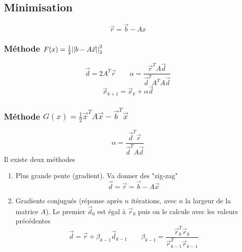 \documentclass[resume]{subfiles}
\begin{document}
\subsection{Minimisation}
$$\boxed{\vec{r}=\vec{b}-Ax}$$
\subsubsection{Méthode $F(x)=\frac{1}{2}\abs{\abs{b-A\vec{x}}}^2_2$}
$$\boxed{\vec{d}=2A^T\vec{r}\qquad \alpha=\frac{\vec{r}^TA\vec{d}}{\vec{d}^TA^TA\vec{d}}}$$
$$\boxed{\vec{x}_{k+1}=\vec{x}_{k}+\alpha\vec{d}}$$
\subsubsection{Méthode $G(x)=\frac{1}{2}\vec{x}^TA\vec{x}-\vec{b}^T\vec{x}$}
$$\boxed{\alpha=\frac{\vec{d}^T\vec{r}}{\vec{d}^TA\vec{d}}}$$
Il existe deux méthodes
\begin{enumerate}
\item Plus grande pente (gradient). Va donner des "zig-zag"
$$\boxed{\vec{d}=\vec{r}=\vec{b}-A\vec{x}}$$
\item Gradients conjugués (réponse après $n$ itérations, avec $n$ la largeur de la matrice $A$). Le premier $\vec{d}_0$ est égal à $\vec{r}_0$ puis on le calcule avec les valeurs précédentes
$$\boxed{\vec{d}=\vec{r}+\beta_{k-1}\vec{d}_{k-1}\qquad \beta_{k-1}=\frac{\vec{r}_{k}^T\vec{r}_{k}}{\vec{r}_{k-1}^T\vec{r}_{k-1}}}$$
\end{enumerate}
\end{document}
